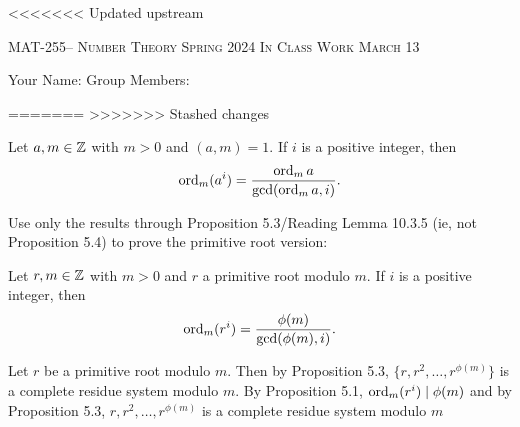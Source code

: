 \documentclass[handout]{ximera}
\date{March 13, 2024}
\date{\classday, 2024}
\begin{document}
\handoutAbstract
\maketitle
<<<<<<< Updated upstream
    \begin{center}%
        {\large \scshape MAT-255-- Number Theory \hfill Spring 2024 \hfill In Class Work March 13}%
        
        {\large
            Your Name: \hrulefill \quad Group Members:\hrulefill \quad \hrulefill
        \par}%
    \end{center}%
=======
>>>>>>> Stashed changes
 

\begin{proposition}[Proposition 5.4]\label{prop:compare-order}
    Let $a,m\in\mathbb Z$ with $m>0$ and $(a,m)=1.$ If $i$ is a positive integer, then 
    \[\operatorname{ord}_m(a^i)=\frac{\operatorname{ord}_m a}{\gcd(\operatorname{ord}_m a,i)}.\]
\end{proposition}

\begin{br}
    Use only the results through Proposition 5.3/Reading Lemma 10.3.5 (ie, not Proposition 5.4) to prove the primitive root version:


    \begin{proposition}
        Let $r,m\in\mathbb Z$ with $m>0$ and $r$ a primitive root modulo $m.$
        If $i$ is a positive integer, then 
    \[\operatorname{ord}_m(r^i)=\frac{\phi(m)}{\gcd(\phi(m),i)}.\]
    \end{proposition}
    \begin{solution}
        Let $r$ be a primitive root modulo $m.$ Then by Proposition 5.3, $\{r,r^2,\dots,r^{\phi(m)}\}$ is a complete residue system modulo $m.$
        By Proposition 5.1, $\operatorname{ord}_m(r^i)\mid \phi(m)$ and by Proposition 5.3, $r,r^2,\dots,r^{\phi(m)}$ is a complete residue system modulo $m$ 
    \end{solution}
    \pdfOnly{\ifhandout
        \vfill
        \else\fi}
\end{br}
\end{document}
